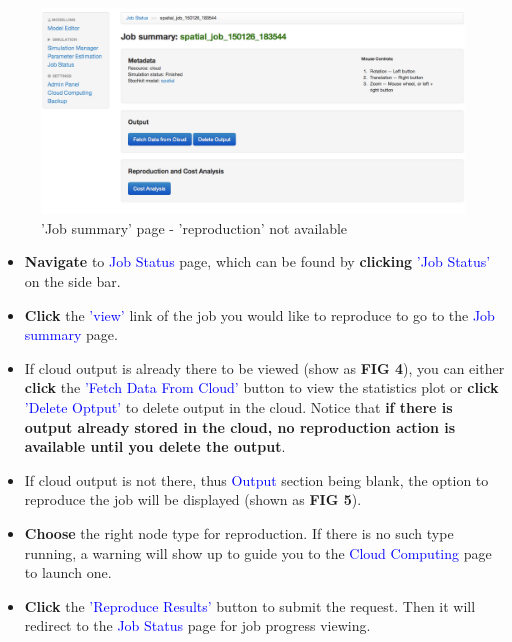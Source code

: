 \begin{figure}[!ht]
\centering
\includegraphics[scale=0.35]{T6/T6_fig_reproduction2.png}
\caption{'Job summary' page - 'reproduction' not available}
\label{fig:2}
\end{figure}

\begin{itemize}
\item \textbf{Navigate} to \textcolor{blue}{Job Status} page, which can be found by \textbf{clicking} \textcolor{blue}{'Job Status'} on the side bar.
\item \textbf{Click} the \textcolor{blue}{'view'} link of the job you would like to reproduce to go to the \textcolor{blue}{Job summary} page.
\item If cloud output is already there to be viewed (show as \textbf{FIG 4}), you can either \textbf{click} the \textcolor{blue}{'Fetch Data From Cloud'} button to view the statistics plot or \textbf{click} \textcolor{blue}{'Delete Optput'} to delete output in the cloud. Notice that \textbf{if there is output already stored in the cloud, no reproduction action is available until you delete the output}.
\item If cloud output is not there, thus \textcolor{blue}{Output} section being blank, the option to reproduce the job will be displayed (shown as \textbf{FIG 5}).
\item \textbf{Choose} the right node type for reproduction. If there is no such type running, a warning will show up to guide you to the \textcolor{blue}{Cloud Computing} page to launch one.
\item \textbf{Click} the \textcolor{blue}{'Reproduce Results'} button to submit the request. Then it will redirect to the \textcolor{blue}{Job Status} page for job progress viewing.

\end{itemize}

